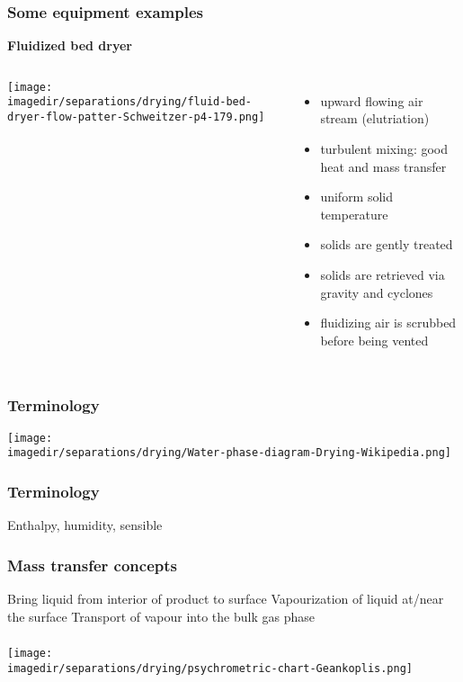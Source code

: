 \begin{frame}\frametitle{Some equipment examples}
	\textbf{Fluidized bed dryer}
	\begin{columns}[t]
			\begin{center}
				\texttt{[image: \\imagedir/separations/drying/fluid-bed-dryer-flow-patter-Schweitzer-p4-179.png]}
			\end{center}
			\vspace{-12pt}
			\begin{itemize}
				\item	upward flowing air stream (elutriation)
				\item	turbulent mixing: good heat and mass transfer
				\item	uniform solid temperature
				\item	solids are gently treated
				\item	solids are retrieved via gravity and cyclones
				\item	fluidizing air is scrubbed before being vented
			\end{itemize}
	\end{columns}
\end{frame}


\begin{frame}\frametitle{Terminology}
	\begin{center}
		\texttt{[image: \\imagedir/separations/drying/Water-phase-diagram-Drying-Wikipedia.png]}
	\end{center}
\end{frame}

\begin{frame}\frametitle{Terminology}
	Enthalpy, humidity, sensible 
\end{frame}

\begin{frame}\frametitle{Mass transfer concepts}
	Bring liquid from interior of product to surface
	Vapourization of liquid at/near the surface
	Transport of vapour into the bulk gas phase

\end{frame}

\begin{frame}\frametitle{}%
	\vfill
	\begin{center}
		\texttt{[image: \\imagedir/separations/drying/psychrometric-chart-Geankoplis.png]}
	\end{center}
\end{frame}

